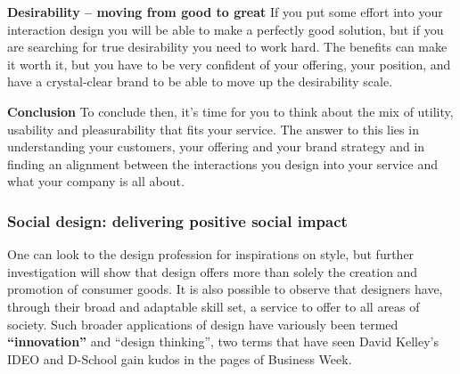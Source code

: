 \textbf{Desirability – moving from good to great}
If you put some effort into your interaction design you will be able to make a perfectly good solution, but if you are searching for true desirability you need to work hard. The benefits can make it worth it, but you have to be very confident of your offering, your position, and have a crystal-clear brand to be able to move up the desirability scale.

\textbf{Conclusion}
To conclude then, it’s time for you to think about the mix of utility, usability and pleasurability that fits your service. The answer to this lies in understanding your customers, your offering and your brand strategy and in finding an alignment between the interactions you design into your service and what your company is all about.

\subsubsection{Social design: delivering positive social impact}


One can look to the design profession for inspirations on style, but further investigation will show that design offers more than solely the creation and promotion of consumer goods. It is also possible to observe that designers have, through their broad and adaptable skill set, a service to offer to all areas of society. Such broader applications of design have variously been termed \textbf{“innovation”} %
and “design thinking”, two terms that have seen David Kelley’s IDEO and D-School gain kudos in the pages of Business Week.

